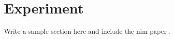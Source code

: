 
\section{Experiment}
Write a sample section here and include the nim paper \cite{ADHIKARI2021164807}.